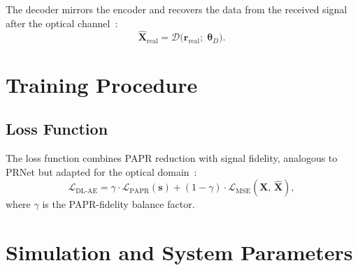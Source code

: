 The decoder mirrors the encoder and recovers the data from the received
signal after the optical channel~\cite{alnaseri2025deep}:
\begin{equation}
    \hat{\bm{X}}_{\mathrm{real}}
    = \mathcal{D}\!\bigl(\bm{r}_{\mathrm{real}};\;\bm{\theta}_D\bigr).
    \label{eq:dlae_decoder}
\end{equation}


\section{Training Procedure}
\label{sec:dlae_training}

\subsection{Loss Function}

The loss function combines PAPR reduction with signal fidelity, analogous
to PRNet but adapted for the optical domain~\cite{alnaseri2025deep}:
\begin{equation}
    \mathcal{L}_{\mathrm{DL\text{-}AE}}
    = \gamma \cdot \mathcal{L}_{\mathrm{PAPR}}(\bm{s})
    + (1 - \gamma) \cdot \mathcal{L}_{\mathrm{MSE}}(\bm{X},\, \hat{\bm{X}}),
    \label{eq:dlae_loss}
\end{equation}
where $\gamma$ is the PAPR-fidelity balance factor.


\section{Simulation and System Parameters}
\label{sec:dlae_params}


